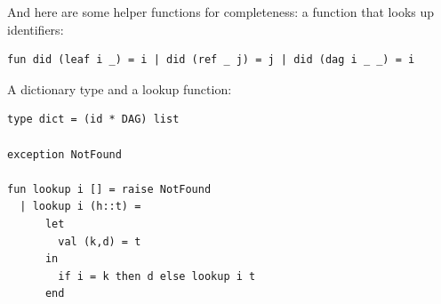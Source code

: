 And here are some helper functions for completeness: a function that looks up identifiers:
\begin{verbatim}
fun did (leaf i _) = i | did (ref _ j) = j | did (dag i _ _) = i
\end{verbatim}

A dictionary type and a lookup function:
\begin{verbatim}
type dict = (id * DAG) list

exception NotFound

fun lookup i [] = raise NotFound
  | lookup i (h::t) =
      let 
        val (k,d) = t
      in
        if i = k then d else lookup i t
      end
\end{verbatim}